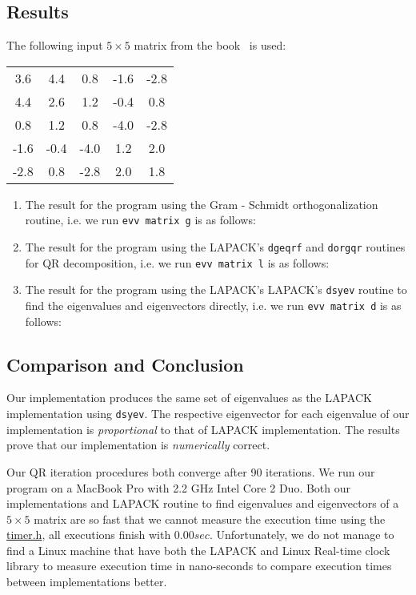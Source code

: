 \documentclass{article}
\begin{document}
\subsection{Results}
The following input $5\times 5$ matrix from the
book~\cite{MathewsNumericalMethodMatlab} is used:
\begin{center}
  \begin{tabular}{ c c c c c }
    3.6 & 4.4 & 0.8 & -1.6 & -2.8 \\
	4.4 & 2.6 & 1.2 & -0.4 & 0.8 \\ 
	0.8 & 1.2 & 0.8 & -4.0 & -2.8 \\ 
	-1.6 & -0.4 & -4.0 & 1.2 & 2.0 \\
	-2.8 & 0.8 & -2.8 & 2.0 & 1.8 
  \end{tabular}
\end{center}
\begin{enumerate}
  \item 
The result for the program using the Gram - Schmidt orthogonalization routine,
i.e. we run \texttt{evv matrix g} is as follows:

\item The result for the program using the LAPACK's \texttt{dgeqrf} and
\texttt{dorgqr} routines for QR decomposition, i.e. we run \texttt{evv matrix l}
is as follows:

\item The result for the program using the LAPACK's LAPACK's \texttt{dsyev}
routine to find the eigenvalues and eigenvectors directly, i.e. we run \texttt{evv matrix d} is as
follows:
\end{enumerate}
\subsection{Comparison and Conclusion}
Our implementation produces the same set of eigenvalues as the LAPACK
implementation using \texttt{dsyev}. The respective eigenvector for each
eigenvalue of our implementation is \textit{proportional} to that of LAPACK
implementation. The results prove that our implementation is
\textit{numerically} correct.

Our QR iteration procedures both converge after 90 iterations. We run our
program on a MacBook Pro with 2.2 GHz Intel Core 2 Duo. Both our implementations
and LAPACK routine to find eigenvalues and eigenvectors of a $5\times 5$ matrix
are so fast that we cannot measure the execution time using the
\href{http://www.stat.berkeley.edu/classes/s244/samples/timer.h}{timer.h}, all
executions finish with $0.00 sec$. Unfortunately, we do not manage to find a
Linux machine that have both the LAPACK and Linux Real-time clock library to
measure execution time in nano-seconds to compare execution times between
implementations better.
\end{document}
